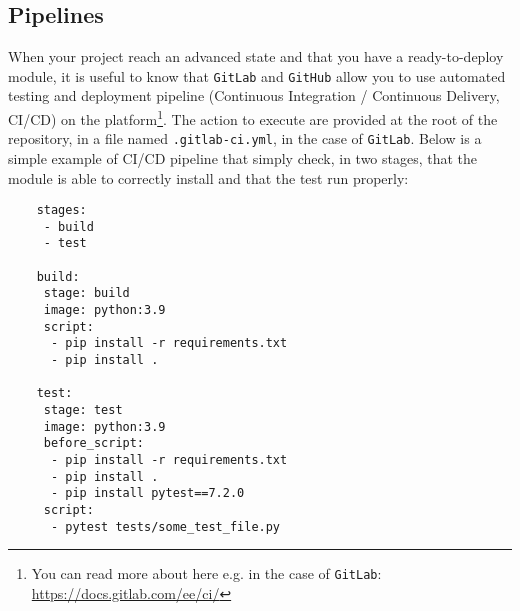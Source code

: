 \documentclass{article}
\begin{document}
\subsection{Pipelines}

When your project reach an advanced state and that you have a ready-to-deploy module, it is useful to know that \texttt{GitLab} and \texttt{GitHub} allow you to use automated testing and deployment pipeline (Continuous Integration / Continuous Delivery, CI/CD) on the platform\footnote{You can read more about here e.g. in the case of \texttt{GitLab}: \url{https://docs.gitlab.com/ee/ci/}}. 
The action to execute are provided at the root of the repository, in a file named \texttt{.gitlab-ci.yml}, in the case of \texttt{GitLab}.
Below is a simple example of CI/CD pipeline that simply check, in two stages, that the module is able to correctly install and that the test run properly:
\begin{lstlisting}
    stages:
     - build
     - test
    
    build:
     stage: build
     image: python:3.9
     script:
      - pip install -r requirements.txt
      - pip install .
    
    test:
     stage: test
     image: python:3.9
     before_script:
      - pip install -r requirements.txt
      - pip install .
      - pip install pytest==7.2.0
     script:
      - pytest tests/some_test_file.py

\end{lstlisting}
\end{document}
